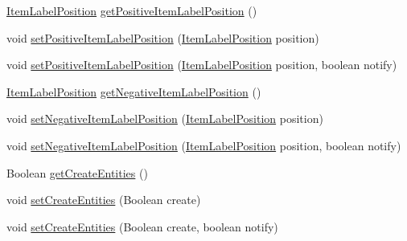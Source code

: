 \begin{DoxyCompactItemize}
\item 
\mbox{\hyperlink{classorg_1_1jfree_1_1chart_1_1labels_1_1_item_label_position}{Item\+Label\+Position}} \mbox{\hyperlink{classorg_1_1jfree_1_1chart_1_1renderer_1_1_abstract_renderer_a2a9b96ccec98379882ae3c8a24e09261}{get\+Positive\+Item\+Label\+Position}} ()
\item 
void \mbox{\hyperlink{classorg_1_1jfree_1_1chart_1_1renderer_1_1_abstract_renderer_ad292484a8924e35756b3fb423fdd4ccc}{set\+Positive\+Item\+Label\+Position}} (\mbox{\hyperlink{classorg_1_1jfree_1_1chart_1_1labels_1_1_item_label_position}{Item\+Label\+Position}} position)
\item 
void \mbox{\hyperlink{classorg_1_1jfree_1_1chart_1_1renderer_1_1_abstract_renderer_ada1e521fa006a9718e401eba342ea910}{set\+Positive\+Item\+Label\+Position}} (\mbox{\hyperlink{classorg_1_1jfree_1_1chart_1_1labels_1_1_item_label_position}{Item\+Label\+Position}} position, boolean notify)
\item 
\mbox{\hyperlink{classorg_1_1jfree_1_1chart_1_1labels_1_1_item_label_position}{Item\+Label\+Position}} \mbox{\hyperlink{classorg_1_1jfree_1_1chart_1_1renderer_1_1_abstract_renderer_a1342825ba4cb7d47141e73b83fc50903}{get\+Negative\+Item\+Label\+Position}} ()
\item 
void \mbox{\hyperlink{classorg_1_1jfree_1_1chart_1_1renderer_1_1_abstract_renderer_a24fd71d04b101f4636e57eb2d5e60b61}{set\+Negative\+Item\+Label\+Position}} (\mbox{\hyperlink{classorg_1_1jfree_1_1chart_1_1labels_1_1_item_label_position}{Item\+Label\+Position}} position)
\item 
void \mbox{\hyperlink{classorg_1_1jfree_1_1chart_1_1renderer_1_1_abstract_renderer_aea75a4da8fcbdd4db4e28c5fe5659ec1}{set\+Negative\+Item\+Label\+Position}} (\mbox{\hyperlink{classorg_1_1jfree_1_1chart_1_1labels_1_1_item_label_position}{Item\+Label\+Position}} position, boolean notify)
\item 
Boolean \mbox{\hyperlink{classorg_1_1jfree_1_1chart_1_1renderer_1_1_abstract_renderer_a605f6ec57d4870fdfbd9e15b49e7c1c0}{get\+Create\+Entities}} ()
\item 
void \mbox{\hyperlink{classorg_1_1jfree_1_1chart_1_1renderer_1_1_abstract_renderer_a7e5a889b80f3d9993cef5a1ac89449ba}{set\+Create\+Entities}} (Boolean create)
\item 
void \mbox{\hyperlink{classorg_1_1jfree_1_1chart_1_1renderer_1_1_abstract_renderer_a9f772fc8aff6aae594354ad4232982e7}{set\+Create\+Entities}} (Boolean create, boolean notify)
\end{DoxyCompactItemize}
